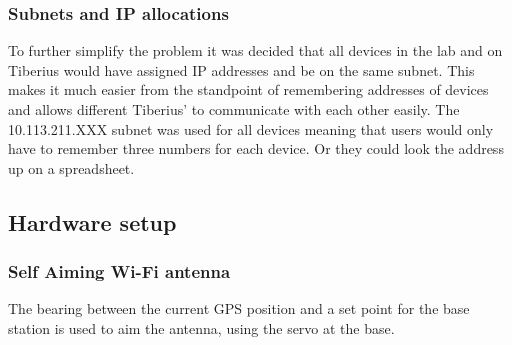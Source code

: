 \subsubsection{Subnets and IP allocations}
To further simplify the problem it was decided that all devices in the lab and on Tiberius would have assigned IP addresses and be on the same subnet. This makes it much easier from the standpoint of remembering addresses of devices and allows different Tiberius' to communicate with each other easily. 
\newline
The 10.113.211.XXX subnet was used for all devices meaning that users would only have to remember three numbers for each device. Or they could look the address up on a spreadsheet.

\subsection{Hardware setup}
\subsubsection{Self Aiming Wi-Fi antenna}
The bearing between the current GPS position and a set point for the base station is used to aim the antenna, using the servo at the base.



